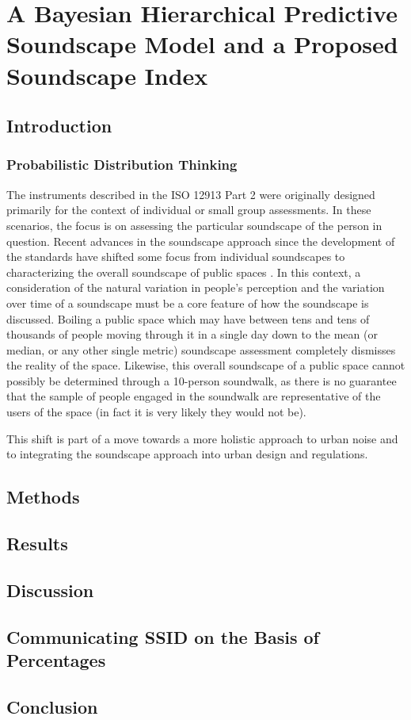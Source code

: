 \chapter{A Bayesian Hierarchical Predictive Soundscape Model and a Proposed Soundscape Index}
\label{ch:bayes}

\section{Introduction}
\subsection{Probabilistic Distribution Thinking}

The instruments described in the ISO 12913 Part 2 \citet{ISO12913_2} were originally designed primarily for the context of individual or small group assessments. In these scenarios, the focus is on assessing the particular soundscape of the person in question. Recent advances in the soundscape approach since the development of the standards have shifted some focus from individual soundscapes to characterizing the overall soundscape of public spaces \citep{Mitchell2020Protocol}. In this context, a consideration of the natural variation in people's perception and the variation over time of a soundscape must be a core feature of how the soundscape is discussed. Boiling a public space which may have between tens and tens of thousands of people moving through it in a single day down to the mean (or median, or any other single metric) soundscape assessment completely dismisses the reality of the space. Likewise, this overall soundscape of a public space cannot possibly be determined through a 10-person soundwalk, as there is no guarantee that the sample of people engaged in the soundwalk are representative of the users of the space (in fact it is very likely they would not be).

This shift is part of a move towards a more holistic approach to urban noise and to integrating the soundscape approach into urban design and regulations.

\section{Methods}

\section{Results}

\section{Discussion}

\section{Communicating SSID on the Basis of Percentages}

\section{Conclusion}

